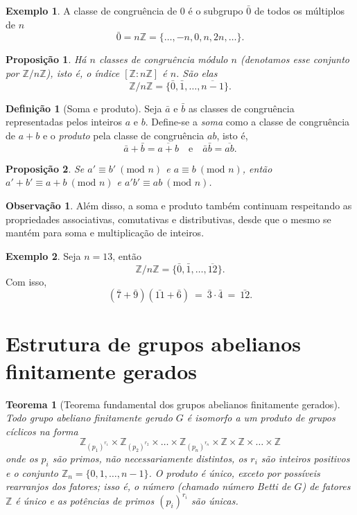 \documentclass[a4paper,12pt]{report}
\theoremstyle{plain}
\newtheorem{teorema}{Teorema}[section]
\newtheorem{proposicao}{Proposição}[section]
\theoremstyle{definition}
\newtheorem{definicao}{Definição}[section]
\newtheorem{observacao}{Observação}[section]
\newtheorem{exemplo}{Exemplo}[section]
\begin{document}
\begin{exemplo}
	A classe de congruência de 0 é o subgrupo \(\bar{0}\)
	de todos os múltiplos de \(n\) \[\bar{0} = n\mathbb{Z} = \{\dots,-n,0,n,2n, \dots\}.\]
\end{exemplo}

\begin{proposicao}
	Há \(n\) classes de congruência módulo \(n\) (denotamos esse conjunto por \(\mathbb{Z}/n\mathbb{Z}\)), isto é, o índice \([\mathbb{Z}:n\mathbb{Z}]\) é \(n\). São elas \[\mathbb{Z}/n\mathbb{Z} =  \{\bar{0}, \bar{1},\dots,\overline{n - 1}\}.\]		
\end{proposicao}

\begin{definicao}[Soma e produto]
	Seja \(\bar a\) e \(\bar b\) as classes de congruência representadas pelos inteiros \(a\) e \(b\). Define-se a \emph{soma} como a classe de congruência de \(a+b\) e o \emph{produto} pela classe de congruência \(ab\), isto é, \[\bar a + \bar b = \overline{a+b} \quad \text{e}\quad \bar a\bar b = \overline{ab}.\]	
\end{definicao}

\begin{proposicao}
	Se \(a' \equiv b'\ (\text{mod }n)\) e \(a\equiv b\ (\text{mod }n)\), então
	\(a' + b' \equiv a+b\ (\text{mod }n)\) e
	\(a'b' \equiv ab \ (\text{mod }n)\).
\end{proposicao}

\begin{observacao}
	Além disso, a soma e produto também continuam respeitando as
	propriedades associativas, comutativas e distributivas, desde que o
	mesmo se mantém para soma e multiplicação de inteiros.
\end{observacao}

\begin{exemplo}
	Seja \(n = 13\), então
	\[\mathbb{Z}/n\mathbb{Z} =  \{\bar{0}, \bar{1},\dots,\overline{12}\}.\]
	Com isso,
	\[(\bar 7 + \bar 9)(\bar{11} + \bar 6) \ = \ \bar 3 \cdot \bar 4 \ = \ \bar{12}.\]
\end{exemplo}


\section{Estrutura de grupos abelianos finitamente gerados}

\begin{teorema}[Teorema fundamental dos grupos abelianos finitamente gerados] \label{teo:abelianfinitelygenerately}
	Todo grupo abeliano finitamente gerado $G$ é isomorfo a um produto de grupos cíclicos na forma $$\mathbb{Z}_{(p_1)^{r_1}}\times\mathbb{Z}_{(p_2)^{r_2}}\times\dots\times\mathbb{Z}_{(p_n)^{r_n}}\times\mathbb{Z}\times\mathbb{Z}\times\dots\times\mathbb{Z} $$ onde os $p_i$ são primos, não necessariamente distintos, os $r_i$ são inteiros positivos e o conjunto $\mathbb{Z}_n = \{0,1,\dots,n-1\}$. O produto é único, exceto por possíveis rearranjos dos fatores; isso é, o número (chamado \emph{número Betti de $G$}) de fatores $\mathbb{Z}$ é único e as potências de primos $(p_i)^{r_i}$ são únicas.
\end{teorema}
\end{document}
